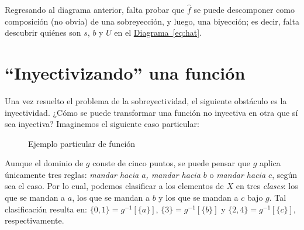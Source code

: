\documentclass[letterpaper,DIV=14,headsepline,12pt]{scrartcl}
\begin{document}
    Regresando al diagrama anterior, falta probar que $\hat{f}$ se puede descomponer como
    composición (no obvia) de una sobreyección, y luego, una biyección; es decir, falta
    descubrir quiénes son $s$, $b$ y $U$ en el
    \hyperref[eq:hat]{Diagrama~\ref*{eq:hat}}.

    \section*{``Inyectivizando'' una función}

    Una vez resuelto el problema de la sobreyectividad, el siguiente obstáculo
    es la inyectividad. ¿Cómo se puede transformar una función no inyectiva en
    otra que sí sea inyectiva? Imaginemos el siguiente caso particular:
    \begin{figure}[H]\label{fig:ejemplo}
        \begin{center}
        \end{center}
        \caption{Ejemplo particular de función}
    \end{figure}

    Aunque el dominio de $g$ conste de cinco puntos, se puede pensar que $g$
    aplica únicamente tres reglas: \textit{mandar hacia $a$, mandar hacia $b$} o
    \textit{mandar hacia $c$}, según sea el caso. Por lo cual, podemos
    clasificar a los elementos de $X$ en tres \textit{clases}: los que se mandan
    a $a$, los que se mandan a $b$ y los que se mandan a $c$ bajo $g$. Tal
    clasificación resulta en: $\{0,1\}=g^{-1}[\{a\}]$, $\{3\}=g^{-1}[\{b\}]$ y
    $\{2,4\}=g^{-1}[\{c\}]$, respectivamente.
\end{document}
